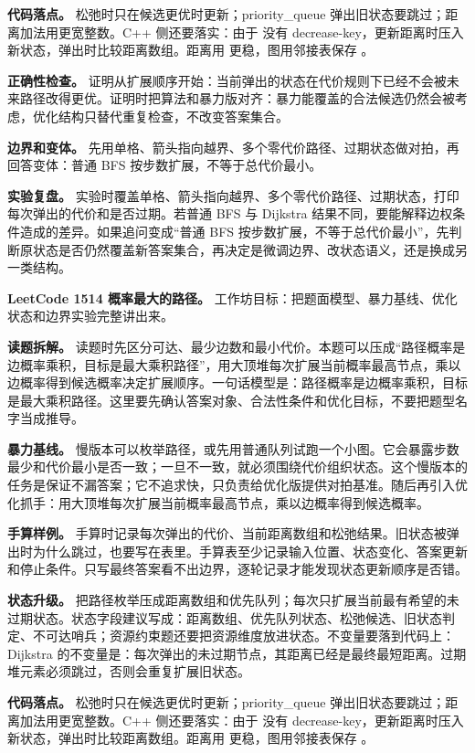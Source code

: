 \textbf{代码落点。} 松弛时只在候选更优时更新；priority\_queue 弹出旧状态要跳过；距离加法用更宽整数。C++ 侧还要落实：由于  没有 decrease-key，更新距离时压入新状态，弹出时比较距离数组。距离用  更稳，图用邻接表保存 。

\textbf{正确性检查。} 证明从扩展顺序开始：当前弹出的状态在代价规则下已经不会被未来路径改得更优。证明时把算法和暴力版对齐：暴力能覆盖的合法候选仍然会被考虑，优化结构只替代重复检查，不改变答案集合。

\textbf{边界和变体。} 先用单格、箭头指向越界、多个零代价路径、过期状态做对拍，再回答变体：普通 BFS 按步数扩展，不等于总代价最小。

\textbf{实验复盘。} 实验时覆盖单格、箭头指向越界、多个零代价路径、过期状态，打印每次弹出的代价和是否过期。若普通 BFS 与 Dijkstra 结果不同，要能解释边权条件造成的差异。如果追问变成“普通 BFS 按步数扩展，不等于总代价最小”，先判断原状态是否仍然覆盖新答案集合，再决定是微调边界、改状态语义，还是换成另一类结构。

\noindent\textbf{LeetCode 1514 概率最大的路径。} 工作坊目标：把题面模型、暴力基线、优化状态和边界实验完整讲出来。

\textbf{读题拆解。} 读题时先区分可达、最少边数和最小代价。本题可以压成“路径概率是边概率乘积，目标是最大乘积路径”，用大顶堆每次扩展当前概率最高节点，乘以边概率得到候选概率决定扩展顺序。一句话模型是：路径概率是边概率乘积，目标是最大乘积路径。这里要先确认答案对象、合法性条件和优化目标，不要把题型名字当成推导。

\textbf{暴力基线。} 慢版本可以枚举路径，或先用普通队列试跑一个小图。它会暴露步数最少和代价最小是否一致；一旦不一致，就必须围绕代价组织状态。这个慢版本的任务是保证不漏答案；它不追求快，只负责给优化版提供对拍基准。随后再引入优化抓手：用大顶堆每次扩展当前概率最高节点，乘以边概率得到候选概率。

\textbf{手算样例。} 手算时记录每次弹出的代价、当前距离数组和松弛结果。旧状态被弹出时为什么跳过，也要写在表里。手算表至少记录输入位置、状态变化、答案更新和停止条件。只写最终答案看不出边界，逐轮记录才能发现状态更新顺序是否错。

\textbf{状态升级。} 把路径枚举压成距离数组和优先队列；每次只扩展当前最有希望的未过期状态。状态字段建议写成：距离数组、优先队列状态、松弛候选、旧状态判定、不可达哨兵；资源约束题还要把资源维度放进状态。不变量要落到代码上：Dijkstra 的不变量是：每次弹出的未过期节点，其距离已经是最终最短距离。过期堆元素必须跳过，否则会重复扩展旧状态。

\textbf{代码落点。} 松弛时只在候选更优时更新；priority\_queue 弹出旧状态要跳过；距离加法用更宽整数。C++ 侧还要落实：由于  没有 decrease-key，更新距离时压入新状态，弹出时比较距离数组。距离用  更稳，图用邻接表保存 。

